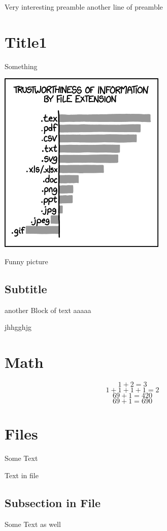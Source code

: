 Very interesting preamble
another line of preamble

\section{Title1}
Something

\includegraphics{image.png}
\caption{Funny picture}
\subsection{Subtitle}
another Block of text
aaaaa

jhhgghjg

\section{Math}
\label{math}
$$1+2 = 3$$
\[1+1+1+1=2\]
\begin{displaymath}
69 + 1 = 420
\end{displaymath}
\begin{equation}
69 + 1 = 690
\end{equation}
\section{Files}
Some Text

Text in file

\subsection{Subsection in File}
Some Text as well


